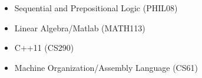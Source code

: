 \begin{cvcourses}
{\begin{multicols}{3}
\begin{itemize}
          \item Sequential and Prepositional Logic (PHIL08) %
          \item Linear Algebra/Matlab (MATH113) %
          \item C++11 (CS290) %
          \item Machine Organization/Assembly Language (CS61) %
        \end{itemize}
      \end{multicols}
    }
\end{cvcourses}
